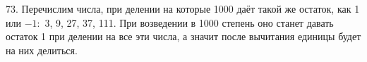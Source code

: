 73. Перечислим числа, при делении на которые 1000 даёт такой же остаток, как 1 или $-1:$ 3, 9, 27, 37, 111. При возведении в 1000 степень оно станет давать остаток 1 при делении на все эти числа, а значит после вычитания единицы будет на них делиться.\\
